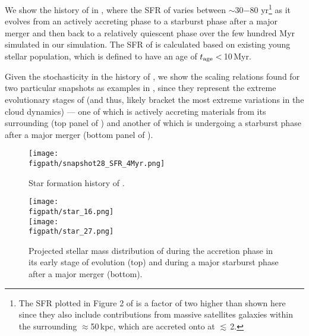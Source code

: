 \documentclass[apj]{emulateapj} %
\begin{document}
We show the \SF history of \flower in , where 
the SFR of \flower varies between $\sim$30$-$80\,\Msun\,yr\pmOne\footnote{
The SFR plotted in Figure 2 of \citet{Pallottini17b}
is a factor of two higher than shown here since they also include contributions from 
massive satellites galaxies within the surrounding $\approx$50\,kpc, which 
are accreted onto \flower at \z$\lesssim$\,2.}
as it evolves from an actively accreting phase to 
a starburst phase after a major merger and then back to a relatively quiescent phase
over the few hundred Myr simulated in our simulation.
The SFR of \flower is calculated based on existing young stellar population, which is 
defined to have an age of $t_{\rm age}<$\,10\,Myr.

Given the stochasticity in the \SF history of \flower, 
we show the scaling relations found for two particular snapshots as examples in ,
since they represent the extreme evolutionary stages of \flower (and thus, likely bracket the
most extreme variations in the cloud dynamics) --- one of which \flower is 
actively accreting materials from its surrounding (top panel of ) 
and another of which \flower is undergoing 
a starburst phase after a major merger (bottom panel of ). 



\begin{figure*}[htbp]
\centering
\texttt{[image: \\figpath/snapshot28\_SFR\_4Myr.png]}  
\caption{
Star formation history of \flower.
\label{fig:SFH}}
\end{figure*}


\begin{figure}[htbp]
\centering
\texttt{[image: \\figpath/star\_16.png]}  
\\ [-5em]
\texttt{[image: \\figpath/star\_27.png]}  
\caption{
Projected stellar mass distribution of \flower during the accretion phase
in its early stage of evolution (top) and during a major starburst phase 
after a major merger (bottom).
\label{fig:phases}}
\end{figure}
\end{document}
